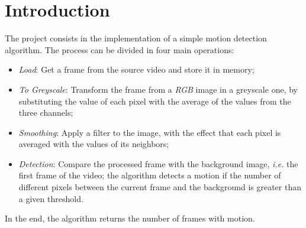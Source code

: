 \section{Introduction}
The project consists in the implementation of a simple motion detection algorithm.
The process can be divided in four main operations:

\begin{itemize}
    \item \emph{Load}: Get a frame from the source video and store it in memory;
    \item \emph{To Greyscale}: Transform the frame from a \emph{RGB} image in a greyscale one, by substituting the value of each pixel with the average of the values from the three channels; 
    \item \emph{Smoothing}: Apply a filter to the image, with the effect that each pixel is averaged with the values of its neighbors;
    \item \emph{Detection}: Compare the processed frame with the background image, \emph{i.e.} the first frame of the video; the algorithm detects a motion if the number of different pixels between the current frame and the background is greater than a given threshold.
\end{itemize}

In the end, the algorithm returns the number of frames with motion.
